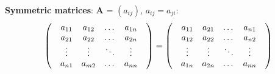 \documentclass[11pt]{article}
\begin{document}
{\textbf{Symmetric matrices}: \textbf{A} = $(a_{ij})$, $a_{ij}=a_{ji}$: \[ 
\left(\quad\begin{matrix}
a_{11} & a_{12} & \dots & a_{1n} \\
a_{21} & a_{22} & \dots & a_{2n} \\
\vdots & \vdots & \ddots & \vdots \\
a_{n1} & a_{m2} & \dots & a_{nn} \\
\end{matrix}\quad\right)=
\left(\quad\begin{matrix}
a_{11} & a_{21} & \dots & a_{n1} \\
a_{12} & a_{22} & \dots & a_{n2} \\
\vdots & \vdots & \ddots & \vdots \\
a_{1n} & a_{2n} & \dots & a_{nn} \\
\end{matrix}\quad\right)
\]}

\end{document}
